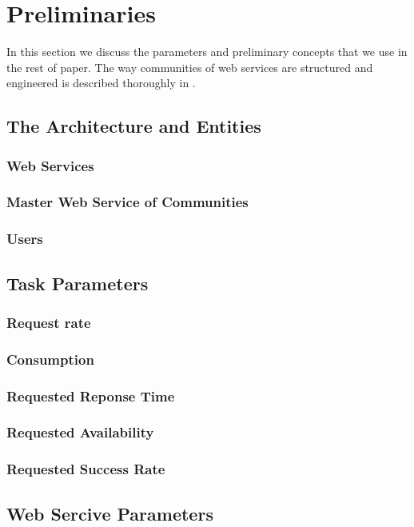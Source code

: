 \documentclass[10pt, conference, compsocconf]{IEEEtran}
\theoremstyle{plain}
\theoremstyle{definition}
\begin{document}
\section{Preliminaries}

In this section we discuss the parameters and preliminary concepts that we use in the rest of paper. The way communities of web services are structured and engineered is described thoroughly in \cite{DBLP:journals/ijebr/MaamarSTBB09}. 

\subsection{The Architecture and Entities }
\subsubsection{Web Services}
\subsubsection{Master Web Service of Communities}
\subsubsection{Users}

\subsection{Task Parameters}
\subsubsection{Request rate}
\subsubsection{Consumption}
\subsubsection{Requested Reponse Time}
\subsubsection{Requested Availability}
\subsubsection{Requested Success Rate}

\subsection{Web Sercive Parameters}
\end{document}
